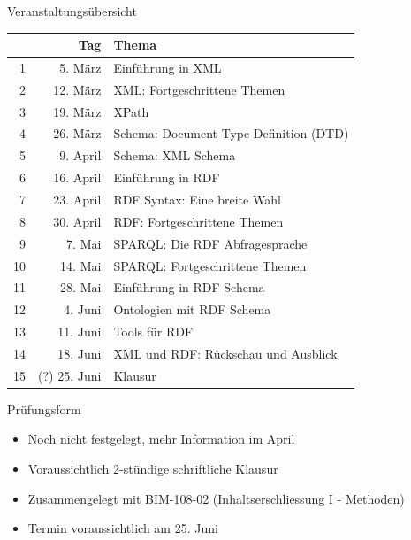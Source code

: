 \documentclass{beamer}
\begin{document}
\begin{frame}{Veranstaltungsübersicht}
	
	\scriptsize
	\begin{center}
	\begin{tabular}{rrp{7cm}}
	  & Tag  & Thema \\
	\hline
	1 & 5. März  & Einführung in XML \\
	2 & 12. März & XML: Fortgeschrittene Themen \\
	3 & 19. März & XPath \\
	4 & 26. März & Schema: Document Type Definition (DTD) \\
	5 & 9. April  & Schema: XML Schema \\
	6 & 16. April & Einführung in RDF \\
	7 & 23. April & RDF Syntax: Eine breite Wahl \\
	8 & 30. April & RDF: Fortgeschrittene Themen \\
	9 & 7. Mai  & SPARQL: Die RDF Abfragesprache \\
	10 & 14. Mai & SPARQL: Fortgeschrittene Themen \\
	11 & 28. Mai & Einführung in RDF Schema \\
	12 & 4. Juni & Ontologien mit RDF Schema \\
	13 & 11. Juni & Tools für RDF \\
	14 & 18. Juni & XML und RDF: Rückschau und Ausblick \\
	15 & (?) 25. Juni & Klausur \\
	\hline
	\end{tabular}
	\end{center}
	
\end{frame}

\begin{frame}{Prüfungsform}
	
	\begin{itemize}
		\item Noch nicht festgelegt, mehr Information im April
		\item Voraussichtlich 2-stündige schriftliche Klausur
		\item Zusammengelegt mit BIM-108-02 (Inhaltserschliessung I - Methoden)
		\item Termin voraussichtlich am 25. Juni
	\end{itemize}
	
\end{frame}
\end{document}
